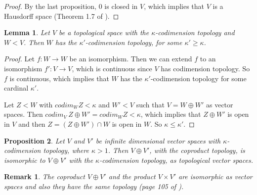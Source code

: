 \documentclass[a4paper,12pt]{article}
\newtheorem{prop}{Proposition}[section]
\newtheorem{obs}{Remark}[section]
\newtheorem{lema}[prop]{Lemma}
\theoremstyle{bloco}
\begin{document}
\begin{proof}By the last proposition, $0$ is closed in $V$, which implies that $V$ is a Hausdorff space (Theorem 1.7 of \cite{Wa}).
\end{proof}

\begin{lema}\label{subspacetopology1}Let $V$ be a topological space with the $\kappa$-codimension topology and $W < V$. Then $W$ has the $\kappa'$-codimension topology, for some $\kappa' \geqslant \kappa$.
\end{lema}

\begin{proof}Let $f: W \rightarrow W$ be an isomorphism. Then we can extend $f$ to an isomorphism $f': V \rightarrow V$, which is continuous since $V$ has codimension topology. So $f$ is continuous, which implies that $W$ has the $\kappa'$-codimension topology for some cardinal $\kappa'$.

Let $Z < W$ with $codim_{W} Z < \kappa$ and $W' < V$ such that $V = W\oplus W'$ as vector spaces. Then $codim_{V} \ Z\oplus W' = codim_{W} Z < \kappa$, which implies that $Z\oplus W'$ is open in $V$ and then $Z =(Z\oplus W') \cap W$ is open in $W$. So $\kappa \leqslant \kappa'$.
\end{proof}

\begin{prop}Let $V$ and $V'$ be infinite dimensional vector spaces with $\kappa$-codimension topology, where $\kappa > 1$. Then $V \oplus V'$, with the coproduct topology, is isomorphic to $V \oplus V'$ with the $\kappa$-codimension topology, as topological vector spaces.
\end{prop}

\begin{obs}The coproduct $V\oplus V'$ and the product $V\times V'$ are isomorphic
as vector spaces and also they have the same topology (page 105 of \cite{BeH}).    
\end{obs}
\end{document}
